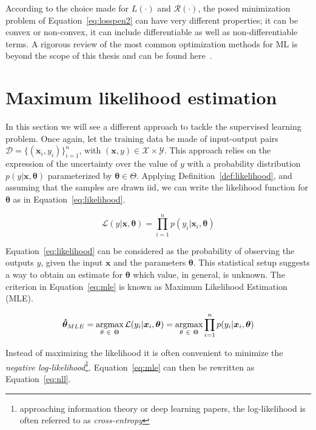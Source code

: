  According to the choice made for $L(\cdot)$ and $\mathcal{R}(\cdot)$, the posed minimization problem of Equation~\eqref{eq:losspen2} can have very different properties; it can be convex or non-convex, it can include differentiable as well as non-differentiable terms. A rigorous review of the most common optimization methods for ML is beyond the scope of this thesis and can be found here~\cite{boyd2004convex, bach2012optimization, sra2012optimization, nesterov2013introductory}.


\section{Maximum likelihood  estimation} \label{sec:mle}
In this section we will see a different approach to tackle the supervised learning problem.
Once again, let the training data be made of input-output pairs $\mathcal{D} = \{(\bm{x}_i, y_i)\}_{i=1}^n$, with $(\bm{x},y) \in \mathcal{X} \times \mathcal{Y}$. This approach relies on the expression of the uncertainty over the value of $y$ with a probability distribution $p(y|\bm{x},\bm{\theta})$ parameterized by $\bm{\theta} \in \Theta$.
Applying Definition~\ref{def:likelihood}, and assuming that the samples are drawn \ac{iid}, we can write the likelihood function for $\bm{\theta}$ as in Equation~\eqref{eq:likelihood}.

\begin{equation} \label{eq:likelihood}
	\mathcal{L}(y|\bm{x}, \bm{\theta}) = \prod_{i=1}^{n} p(y_i | \bm{x}_i , \bm{\theta})
\end{equation}

Equation~\eqref{eq:likelihood} can be considered as the probability of observing the outputs $y$, given the input $\bm{x}$ and the parameters $\bm{\theta}$.
This statistical setup suggests a way to obtain an estimate for $\bm{\theta}$ which value, in general, is unknown. The criterion in Equation~\eqref{eq:mle} is known as Maximum Likelihood Estimation (MLE).

\begin{equation} \label{eq:mle}
	\bm{\hat \theta}_{MLE} =\mathop{\mathrm{argmax}}\limits_{\theta~\in~\Theta}\mathcal{L}(y_i|\bm{x}_i, \bm{\theta}) = \mathop{\mathrm{argmax}}\limits_{\theta~\in~\Theta} \prod_{i=1}^{n} p(y_i | \bm{x}_i, \bm{\theta})
\end{equation}

Instead of maximizing the likelihood it is often convenient to minimize the \textit{negative log-likelihood}\footnote{approaching information theory or deep learning papers, the log-likelihood is often referred to as \textit{cross-entropy}}. Equation~\eqref{eq:mle} can then be rewritten as Equation~\eqref{eq:nll}.

